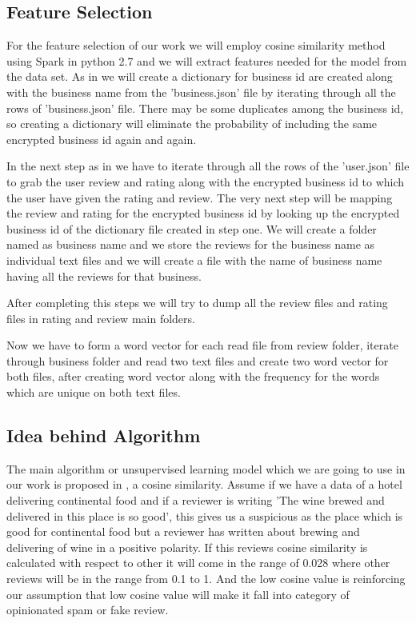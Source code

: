 \documentclass[sigconf]{acmart}
\begin{document}
\subsection{Feature Selection}

For the feature selection of our work we will employ cosine similarity method using Spark in python 2.7 and we will extract features needed for the model from the data set. As in \cite{originalPaper} we will create a dictionary for business id are created along with the business name from the 'business.json' file by iterating through all the rows of 'business.json' file. There may be some duplicates among the business id, so creating a dictionary will eliminate the probability of including the same encrypted business id again and again.

In the next step as in \cite{originalPaper} we have to iterate through all the rows of the 'user.json' file to grab the user review and rating along with the encrypted business id to which the user have given the rating and review. The very next step will be mapping the review and rating for the encrypted business id by looking up the encrypted business id of the dictionary file created in step one. We will create a folder named as business name and we store the reviews for the business name as individual text files and we will create a file with the name of business name having all the reviews for that business.

After completing this steps we will try to dump all the review files and rating files in rating and review main folders.

Now we have to form a word vector for each read file from review folder, iterate through business folder and read two text files and create two word vector for both files, after creating word vector along with the frequency for the words which are unique on both text files.  

\subsection{Idea behind Algorithm}

The main algorithm or unsupervised learning model which we are going to use in our work is proposed in \cite{originalPaper}, a cosine similarity. Assume if we have a data of a hotel delivering continental food and if a reviewer is writing 'The wine brewed and delivered in this place is so good', this gives us a suspicious as the place which is good for continental food but a reviewer has written about brewing and delivering of wine in a positive polarity. If this reviews cosine similarity is calculated with respect to other it will come in the range of 0.028 where other reviews will be in the range from 0.1 to 1. And the low cosine value is reinforcing our assumption that low cosine value will make it fall into category of opinionated spam or fake review.
\end{document}
